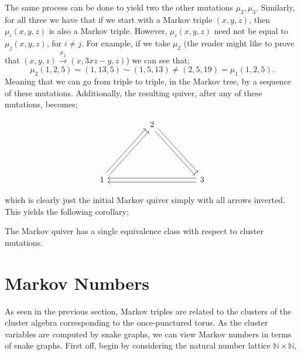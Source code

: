  The same process can be done to yield two the other mutations $\mu_2,\mu_3$. Similarly, for all three we have that if we start with a Markov triple $(x,y,z)$, then $\mu_i(x,y,z)$ is also a Markov triple. However, $\mu_i(x,y,z)$ need not be equal to $\mu_j(x,y,z)$, for $i \ne j$. For example, if we take $\mu_2$ (the reader might like to prove that $(x,y,z) \xrightarrow{\mu_2} (x,3xz-y,z)$) we can see that;
\begin{equation*}
    \mu_2(1,2,5) = (1,13,5) \sim (1,5,13) \ne (2,5,19) = \mu_1(1,2,5).
\end{equation*}
Meaning that we can go from triple to triple, in the Markov tree, by a sequence of these mutations. Additionally, the resulting quiver, after any of these mutations, becomes;
\begin{figure}[H]
    \centering
    \[\begin{tikzcd}
	&& 2\\
	\\
	\\
	1 &&&& 3
	\arrow[shift left=1, from=4-1, to=1-3]
	\arrow[shift right=1, from=4-1, to=1-3]
	\arrow[shift left=1, from=1-3, to=4-5]
	\arrow[shift right=1, from=1-3, to=4-5]
	\arrow[shift left=1, from=4-5, to=4-1]
	\arrow[shift right=1, from=4-5, to=4-1]
\end{tikzcd}\]
\end{figure}
which is clearly just the initial Markov quiver simply with all arrows inverted. This yields the following corollary;
\begin{corollary}
The Markov quiver has a single equivalence class with respect to cluster mutations.
\end{corollary}

\section{Markov Numbers}
As seen in the previous section, Markov triples are related to the clusters of the cluster algebra corresponding to the once-punctured torus. As the cluster variables are computed by snake graphs, we can view Markov numbers in terms of snake graphs. First off, begin by considering the natural number lattice $\mathbb{N} \times \mathbb{N}$, \\

